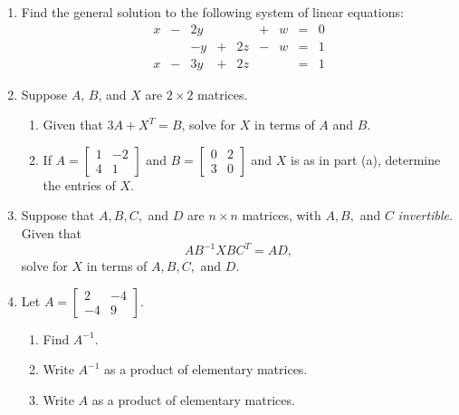 \documentclass[12pt]{article}
\newcommand{\points}[1]{\marginpar{\hspace{24pt}[#1]}}
\begin{document}
\begin{enumerate}
\item Find the general solution to the following system of linear equations: \points{10}
\[
\begin{array}{ccccccccc}
x&-&2y& &  &+&w&=&0\\
 & &-y&+&2z&-&w&=&1\\
x&-&3y&+&2z& & &=&1 
\end{array}
\]

\newpage

\item Suppose $A$, $B$, and $X$ are $2\times 2$ matrices.
\begin{enumerate}
\item Given that $3A+X^T=B$, solve for $X$ in terms of $A$ and $B$.\points{3}

\vspace{1.25in}

\item If $A=\begin{bmatrix}1&-2\\4&1\end{bmatrix}$ and $B=\begin{bmatrix}0&2\\3&0\end{bmatrix}$ and $X$ is as in part (a), determine the entries of $X$. \points{3}

\vspace{2.25in}

\end{enumerate}
\item Suppose that $A,B,C,$ and $D$ are $n\times n$ matrices, with $A,B,$ and $C$ {\em invertible}. Given that \points{4}
\[
AB^{-1}XBC^T = AD,
\]
solve for $X$ in terms of $A,B,C,$ and $D$.
\newpage

\item Let $A=\begin{bmatrix}2&-4\\-4&9\end{bmatrix}$.
\begin{enumerate}
\item Find $A^{-1}$. \points{5}

\vspace{3in}

\item Write $A^{-1}$ as a product of elementary matrices. \points{3}

\vspace{2.5in}

\item Write $A$ as a product of elementary matrices. \points{2}
\end{enumerate}
\end{enumerate}
\end{document}
